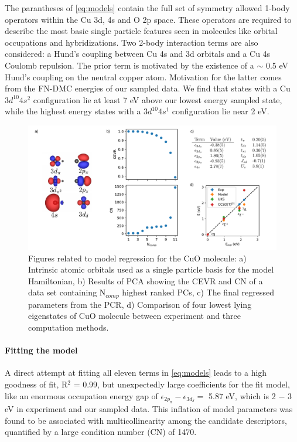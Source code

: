 \documentclass[12pt]{article}
\begin{document}
The parantheses of \eqref{eq:models} contain the full set of symmetry allowed 1-body operators within the Cu 3d, 4s and O 2p space.
These operators are required to describe the most basic single particle features seen in molecules like orbital occupations and hybridizations.
Two 2-body interaction terms are also considered: a Hund's coupling between Cu 4s and 3d orbitals and a Cu 4s Coulomb repulsion.
The prior term is motivated by the existence of a $\sim $ 0.5 eV Hund's coupling on the neutral copper atom.
Motivation for the latter comes from the FN-DMC energies of our sampled data.
We find that states with a Cu $3d^{10} 4s^{2}$ configuration lie at least 7 eV above our lowest energy sampled state, while the highest energy states with a $3d^{10} 4s^{1}$ configuration lie near 2 eV.

\begin{figure}
\centering
\includegraphics[width=1.0\linewidth]{./figs/cuo_regr_2.pdf}
\caption{Figures related to model regression for the CuO molecule: a) Intrinsic atomic orbitals used as a single particle basis for the model Hamiltonian, b) Results of PCA showing the CEVR and CN of a data set containing N$_{comp}$  highest ranked PCs, c) The final regressed parameters from the PCR, d) Comparison of four lowest lying eigenstates of CuO molecule between experiment and three computation methods.}
\label{fig:cuo_regr}
\end{figure}

\paragraph{Fitting the model}
A direct attempt at fitting all eleven terms in \eqref{eq:models} leads to a high goodness of fit, R$^2$ = 0.99, but unexpectedly large coefficients for the fit model, like an enormous occupation energy gap of $\epsilon_{2p_\pi} - \epsilon_{3d_\delta} = $ 5.87 eV, which is 2 $-$ 3 eV in experiment and our sampled data.
This inflation of model parameters was found to be associated with multicollinearity among the candidate descriptors, quantified by a large condition number (CN) of 1470.
\end{document}
